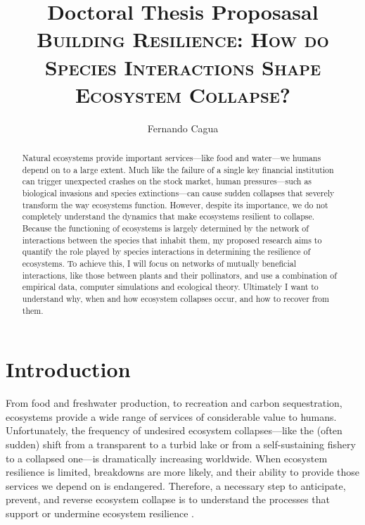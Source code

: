 \documentclass[a4paper]{article}
\title{
	{\normalsize Doctoral Thesis Proposasal} \\
	{\LARGE \textsc{Building Resilience: How do Species Interactions Shape Ecosystem Collapse?}}
}
\author{
  {\large Fernando Cagua}
}
\date{}
\begin{document}
\maketitle

\begin{abstract}
  Natural ecosystems provide important services---like food and water---we humans depend on to a large extent.
  Much like the failure of a single key financial institution can trigger unexpected crashes on the stock market, human pressures---such as biological invasions and species extinctions---can cause sudden collapses that severely transform the way ecosystems function.
  However, despite its importance, we do not completely understand the dynamics that make ecosystems resilient to collapse.
  Because the functioning of ecosystems is largely determined by the network of interactions between the species that inhabit them, my proposed research aims to quantify the role played by species interactions in determining the resilience of ecosystems.
  To achieve this, I will focus on networks of mutually beneficial interactions, like those between plants and their pollinators, and use a combination of empirical data, computer simulations and ecological theory.
  Ultimately I want to understand why, when and how ecosystem collapses occur, and how to recover from them.
\end{abstract}









\section*{Introduction}

From food and freshwater production, to recreation and carbon sequestration, ecosystems provide a wide range of services of considerable value to humans.
Unfortunately, the frequency of undesired ecosystem collapses---like the (often sudden) shift from a transparent to a turbid lake or from a self-sustaining fishery to a collapsed one---is dramatically increasing worldwide\autocite{Scheffer2001a}.
When ecosystem resilience is limited, breakdowns are more likely, and their ability to provide those services we depend on is endangered.
Therefore, a necessary step to anticipate, prevent, and reverse ecosystem collapse is to understand the processes that support or undermine ecosystem resilience \autocite{Hughes2005, Tylianakis2008}.
\end{document}
